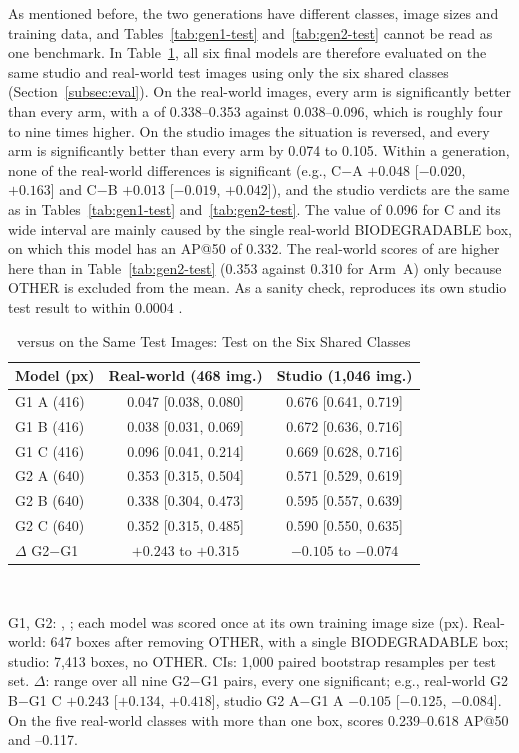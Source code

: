 As mentioned before, the two generations have different classes, image sizes and training data, and Tables~\ref{tab:gen1-test} and~\ref{tab:gen2-test} cannot be read as one benchmark. In Table~\ref{tab:g1g2}, all six final models are therefore evaluated on the same studio and real-world test images using only the six shared classes (Section~\ref{subsec:eval}). On the real-world images, every \gentwo arm is significantly better than every \genone arm, with a \mapfifty of 0.338--0.353 against 0.038--0.096, which is roughly four to nine times higher. On the studio images the situation is reversed, and every \genone arm is significantly better than every \gentwo arm by 0.074 to 0.105. Within a generation, none of the real-world differences is significant (e.g., \genone C$-$A $+0.048$ [$-0.020$, $+0.163$] and \gentwo C$-$B $+0.013$ [$-0.019$, $+0.042$]), and the studio verdicts are the same as in Tables~\ref{tab:gen1-test} and~\ref{tab:gen2-test}. The value of 0.096 for \genone C and its wide interval are mainly caused by the single real-world BIODEGRADABLE box, on which this model has an AP@50 of 0.332. The real-world scores of \gentwo are higher here than in Table~\ref{tab:gen2-test} (0.353 against 0.310 for Arm~A) only because OTHER is excluded from the mean. As a sanity check, \genone reproduces its own studio test result to within 0.0004 \mapfifty.

\begin{table}[!t]
\centering
\caption{\genone versus \gentwo on the Same Test Images: Test \mapfifty [95\% CI] on the Six Shared Classes}
\label{tab:g1g2}
\footnotesize
\begin{tabular}{@{}lcc@{}}
\toprule
Model (px) & Real-world (468 img.) & Studio (1,046 img.) \\
\midrule
G1 A (416) & 0.047 [0.038, 0.080] & 0.676 [0.641, 0.719] \\
G1 B (416) & 0.038 [0.031, 0.069] & 0.672 [0.636, 0.716] \\
G1 C (416) & 0.096 [0.041, 0.214] & 0.669 [0.628, 0.716] \\
\midrule
G2 A (640) & 0.353 [0.315, 0.504] & 0.571 [0.529, 0.619] \\
G2 B (640) & 0.338 [0.304, 0.473] & 0.595 [0.557, 0.639] \\
G2 C (640) & 0.352 [0.315, 0.485] & 0.590 [0.550, 0.635] \\
\midrule
$\Delta$ G2$-$G1 & $+0.243$ to $+0.315$ & $-0.105$ to $-0.074$ \\
\bottomrule
\end{tabular}
\\[2pt]
\parbox{\columnwidth}{\footnotesize G1, G2: \genone, \gentwo; each model was scored once at its own training image size (px). Real-world: 647 boxes after removing OTHER, with a single BIODEGRADABLE box; studio: 7,413 boxes, no OTHER. CIs: 1,000 paired bootstrap resamples per test set. $\Delta$: range over all nine G2$-$G1 pairs, every one significant; e.g., real-world G2 B$-$G1 C $+0.243$ [$+0.134$, $+0.418$], studio G2 A$-$G1 A $-0.105$ [$-0.125$, $-0.084$]. On the five real-world classes with more than one box, \gentwo scores 0.239--0.618 AP@50 and --0.117.}
\end{table}

